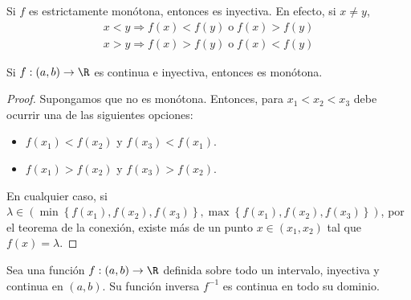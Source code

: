 \begin{observation}
\normalfont Si $\displaystyle f $ es estrictamente monótona, entonces es inyectiva. En efecto, si $\displaystyle x \neq y $, 
\[
\begin{split}
x < y \Rightarrow f\left(x\right) < f\left(y\right) \; \text{o} \;  f\left(x\right) > f\left(y\right) \\
x > y \Rightarrow f\left(x\right) > f\left(y\right) \; \text{o} \; f\left(x\right) < f\left(y\right)
\end{split}
\]
\end{observation}
\begin{flema}[]
\normalfont Si $\displaystyle f : \left(a,b\right) \to \R $ es continua e inyectiva, entonces es monótona.
\end{flema}
\begin{proof}
Supongamos que no es monótona. Entonces, para $\displaystyle x_{1} < x_{2} < x_{3} $ debe ocurrir una de las siguientes opciones:
\begin{itemize}
\item $\displaystyle f\left(x_{1}\right) < f\left(x_{2}\right) $ y $\displaystyle f\left(x_{3}\right) < f\left(x_{1}\right) $.
\item $\displaystyle f\left(x_{1}\right) > f\left(x_{2}\right) $ y $\displaystyle f\left(x_{3}\right) > f\left(x_{2}\right) $.
\end{itemize}
En cualquier caso, si $\displaystyle \lambda \in \left(\min\left\{ f\left(x_{1}\right), f\left(x_{2}\right), f\left(x_{3}\right)\right\} , \max\left\{ f\left(x_{1}\right), f\left(x_{2}\right), f\left(x_{3}\right)\right\} \right) $, por el teorema de la conexión, existe más de un punto $\displaystyle x \in \left(x_{1}, x_{2}\right) $ tal que $\displaystyle f\left(x\right) = \lambda  $. 
\end{proof}
\begin{ftheorem}
\normalfont Sea una función $\displaystyle f: \left(a,b\right) \to \R $ definida sobre todo un intervalo, inyectiva y continua en $\displaystyle \left(a,b\right) $. Su función inversa $\displaystyle f^{-1} $ es continua en todo su dominio.
\end{ftheorem}
